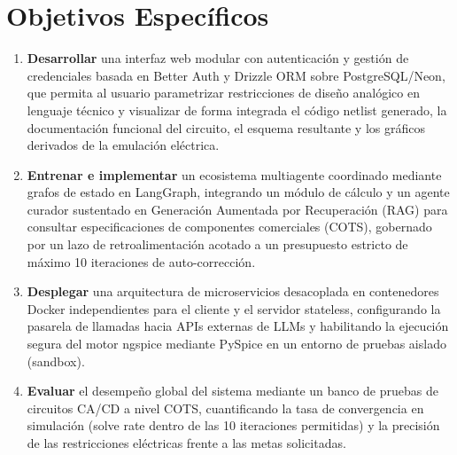\section*{Objetivos Específicos}


\begin{enumerate}
    
    \item \textbf{Desarrollar} una interfaz web modular con autenticación y gestión de credenciales basada en Better Auth y Drizzle ORM sobre PostgreSQL/Neon, que permita al usuario parametrizar restricciones de diseño analógico en lenguaje técnico y visualizar de forma integrada el código netlist generado, la documentación funcional del circuito, el esquema resultante y los gráficos derivados de la emulación eléctrica.   
    
    \item \textbf{Entrenar e implementar} un ecosistema multiagente coordinado mediante grafos de estado en LangGraph, integrando un módulo de cálculo y un agente curador sustentado en Generación Aumentada por Recuperación (RAG) para consultar especificaciones de componentes comerciales (COTS), gobernado por un lazo de retroalimentación acotado a un presupuesto estricto de máximo 10 iteraciones de auto-corrección.

    \item \textbf{Desplegar} una arquitectura de microservicios desacoplada en contenedores Docker independientes para el cliente y el servidor stateless, configurando la pasarela de llamadas hacia APIs externas de LLMs y habilitando la ejecución segura del motor ngspice mediante PySpice en un entorno de pruebas aislado (sandbox). 
    \item \textbf{Evaluar} el desempeño global del sistema mediante un banco de pruebas de circuitos CA/CD a nivel COTS, cuantificando la tasa de convergencia en simulación (solve rate dentro de las 10 iteraciones permitidas) y la precisión de las restricciones eléctricas frente a las metas solicitadas. 
    
    
\end{enumerate}